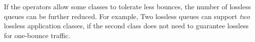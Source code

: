  If the operators allow some classes
to tolerate less bounces, the number of lossless queues can be further reduced. For example,
Two lossless queues can support {\em two} lossless application classes, if the second class
does not need to guarantee lossless for one-bounce traffic.















